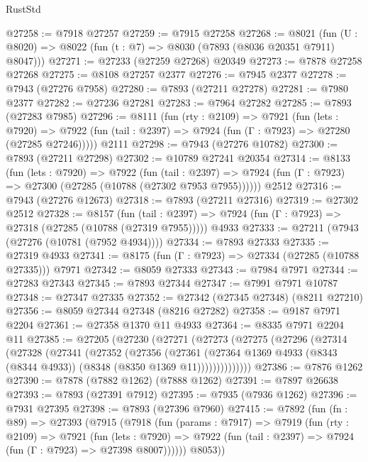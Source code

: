 \begin{lexlean}{RustStd}
\begin{coremodule}
@27258 := @7918 @27257
@27259 := @7915 @27258
@27268 := @8021
    (fun (U : @8020) => @8022 (fun (t : @7) => @8030 (@7893 (@8036 @20351 @7911) @8047)))
@27271 := @27233 (@27259 @27268) @20349
@27273 := @7878 @27258 @27268
@27275 := @8108 @27257 @2377
@27276 := @7945 @2377
@27278 := @7943 (@27276 @7958)
@27280 := @7893 (@27211 @27278)
@27281 := @7980 @2377
@27282 := @27236 @27281
@27283 := @7964 @27282
@27285 := @7893 (@27283 @7985)
@27296 := @8111
    (fun (rty : @2109) =>
    @7921
      (fun (lets : @7920) =>
      @7922 (fun (tail : @2397) => @7924 (fun (Γ : @7923) => @27280 (@27285 @27246)))))
    @2111
@27298 := @7943 (@27276 @10782)
@27300 := @7893 (@27211 @27298)
@27302 := @10789 @27241 @20354
@27314 := @8133
    (fun (lets : @7920) =>
    @7922
      (fun (tail : @2397) =>
      @7924 (fun (Γ : @7923) => @27300 (@27285 (@10788 (@27302 @7953 @7955))))))
    @2512
@27316 := @7943 (@27276 @12673)
@27318 := @7893 (@27211 @27316)
@27319 := @27302 @2512
@27328 := @8157
    (fun (tail : @2397) => @7924 (fun (Γ : @7923) => @27318 (@27285 (@10788 (@27319 @7955)))))
    @4933
@27333 := @27211 (@7943 (@27276 (@10781 (@7952 @4934))))
@27334 := @7893 @27333
@27335 := @27319 @4933
@27341 := @8175 (fun (Γ : @7923) => @27334 (@27285 (@10788 @27335))) @7971
@27342 := @8059 @27333
@27343 := @7984 @7971
@27344 := @27283 @27343
@27345 := @7893 @27344
@27347 := @7991 @7971 @10787
@27348 := @27347 @27335
@27352 := @27342 (@27345 @27348) (@8211 @27210)
@27356 := @8059 @27344 @27348 (@8216 @27282)
@27358 := @9187 @7971 @2204
@27361 := @27358 @1370 @11 @4933
@27364 := @8335 @7971 @2204 @11
@27385 := @27205
    (@27230
      (@27271
        (@27273
          (@27275
            (@27296
              (@27314
                (@27328
                  (@27341
                    (@27352
                      (@27356
                        (@27361
                          (@27364
                            @1369
                            @4933
                            (@8343 (@8344 @4933))
                            (@8348 (@8350 @1369 @11))))))))))))))
@27386 := @7876 @1262
@27390 := @7878 (@7882 @1262) (@7888 @1262)
@27391 := @7897 @26638
@27393 := @7893 (@27391 @7912)
@27395 := @7935 (@7936 @1262)
@27396 := @7931 @27395
@27398 := @7893 (@27396 @7960)
@27415 := @7892
    (fun (fn : @89) =>
    @27393
      (@7915
        (@7918
          (fun (params : @7917) =>
          @7919
            (fun (rty : @2109) =>
            @7921
              (fun (lets : @7920) =>
              @7922 (fun (tail : @2397) => @7924 (fun (Γ : @7923) => @27398 @8007))))))
        @8053))

\end{coremodule}
\end{lexlean}
